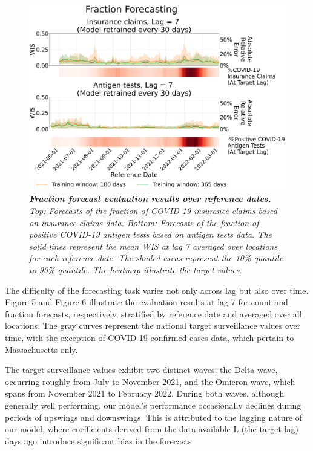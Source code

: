 \begin{figure}[h!]
    \centering
    \includegraphics[width=\textwidth]{figs/experiment_fraction_result_time_series.pdf}
    \caption{\emph{\textbf{Fraction forecast evaluation results over reference dates.} Top: Forecasts of the fraction of COVID-19 insurance claims based on insurance claims data. Bottom: Forecasts of the fraction of positive COVID-19 antigen tests based on antigen tests data.  The solid lines represent the mean WIS at lag 7 averaged over locations for each reference date. The shaded areas represent the 10\% quantile to 90\% quantile. The heatmap illustrate the target values.}}
\end{figure}

The difficulty of the forecasting task varies not only across lag but also over time. Figure 5 and Figure 6 illustrate the evaluation results at lag 7 for count and fraction forecasts, respectively, stratified by reference date and averaged over all locations. The gray curves represent the national target surveillance values over time, with the exception of COVID-19 confirmed cases data, which pertain to Massachusetts only.

The target surveillance values exhibit two distinct waves: the Delta wave, occurring roughly from July to November 2021, and the Omicron wave, which spans from November 2021 to February 2022. During both waves, although generally well performing, our model's performance occasionally declines during periods of upswings and downswings. This is attributed to the lagging nature of our model, where coefficients derived from the data available L (the target lag) days ago introduce significant bias in the forecasts.

